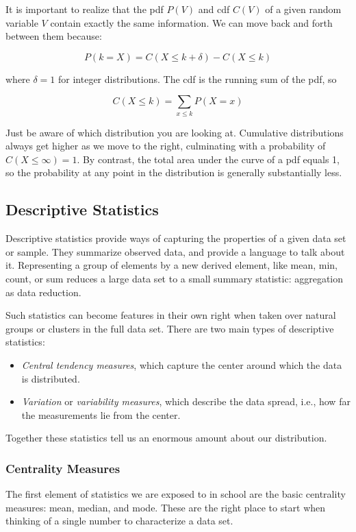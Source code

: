 \documentclass[10pt]{article}
\begin{document}
It is important to realize that the pdf \(P(V)\) and cdf \(C(V)\) of a given random variable \(V\) contain exactly the same information. We can move back and forth between them because:

\[ P(k=X)=C(X \leq k+\delta)-C(X \leq k) \]

where \(\delta=1\) for integer distributions. The cdf is the running sum of the pdf, so

\[ C(X \leq k)=\sum_{x \leq k} P(X=x) \]

Just be aware of which distribution you are looking at. Cumulative distributions always get higher as we move to the right, culminating with a probability of \(C(X \leq \infty)=1\). By contrast, the total area under the curve of a pdf equals 1, so the probability at any point in the distribution is generally substantially less.


\subsection{Descriptive Statistics}
Descriptive statistics provide ways of capturing the properties of a given data set or sample. They summarize observed data, and provide a language to talk about it. Representing a group of elements by a new derived element, like mean, min, count, or sum reduces a large data set to a small summary statistic: aggregation as data reduction.

Such statistics can become features in their own right when taken over natural groups or clusters in the full data set. There are two main types of descriptive statistics:

\begin{itemize}
  \item \textit{Central tendency measures}, which capture the center around which the data is distributed.
  \item \textit{Variation} or \textit{variability measures}, which describe the data spread, i.e., how far the measurements lie from the center.
\end{itemize}

Together these statistics tell us an enormous amount about our distribution.

\subsubsection{Centrality Measures}
The first element of statistics we are exposed to in school are the basic centrality measures: mean, median, and mode. These are the right place to start when thinking of a single number to characterize a data set.
\end{document}
